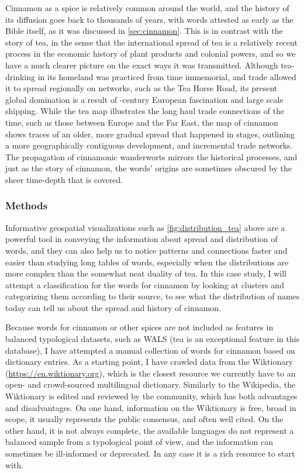 Cinnamon as a spice is relatively common around the world, and the history of its diffusion goes back to thousands of years, with words attested as early as the Bible itself, as it was discussed in \cref{sec:cinnamon}. This is in contrast with the story of tea, in the sense that the international spread of tea is a relatively recent process in the economic history of plant products and colonial powers, and so we have a much clearer picture on the exact ways it was transmitted. Although tea-drinking in its homeland was practiced from time immemorial, and trade allowed it to spread regionally on networks, such as the Tea Horse Road, its present global domination is a result of -century European fascination and large scale shipping. While the tea map illustrates the long haul trade connections of the time, such as those between Europe and the Far East, the map of cinnamon shows traces of an older, more gradual spread that happened in stages, outlining a more geographically contiguous development, and incremental trade networks. The propagation of cinnamonic \glspl{wanderwort} mirrors the historical processes, and just as the story of cinnamon, the words' origins are sometimes obscured by the sheer time-depth that is covered.

\subsubsection{Methods}

Informative geospatial visualizations such as \cref{fig:distribution_tea} above are a powerful tool in conveying the information about spread and distribution of words, and they can also help us to notice patterns and connections faster and easier than studying long tables of words, especially when the distributions are more complex than the somewhat neat duality of tea. In this case study, I will attempt a classification for the words for cinnamon by looking at clusters and categorizing them according to their source, to see what the distribution of names today can tell us about the spread and history of cinnamon.

Because words for cinnamon or other spices are not included as features in balanced typological datasets, such as \gls{WALS} (tea is an exceptional feature in this database), I have attempted a manual collection of words for cinnamon based on dictionary entries. As a starting point, I have crawled data from the Wiktionary (\url{https://en.wiktionary.org}), which is the closest resource we currently have to an open- and crowd-sourced multilingual dictionary. Similarly to the Wikipedia, the Wiktionary is edited and reviewed by the community, which has both advantages and disadvantages. On one hand, information on the Wiktionary is free, broad in scope, it usually represents the public consensus, and often well cited. On the other hand, it is not always complete, the available languages do not represent a balanced sample from a typological point of view, and the information can sometimes be ill-informed or deprecated. In any case it is a rich resource to start with. 


